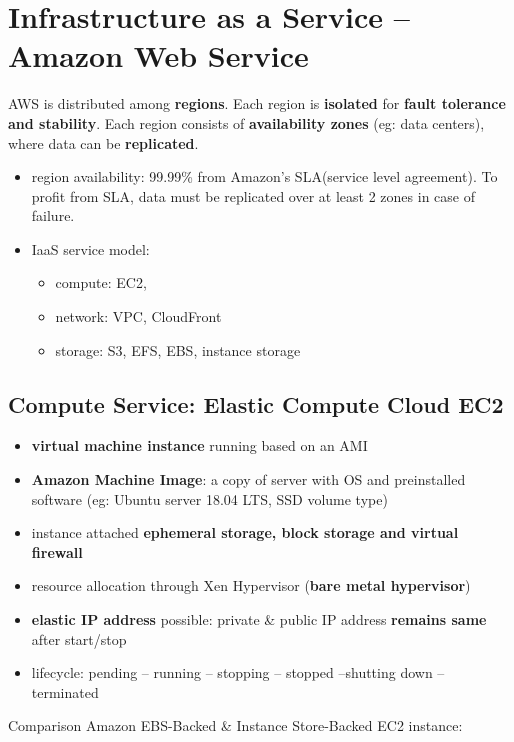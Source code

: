 \section{Infrastructure as a Service -- Amazon Web Service}

AWS is distributed among \textbf{regions}. Each region is \textbf{isolated} for \textbf{fault tolerance and stability}. Each region consists of \textbf{availability zones} (eg: data centers), where data can be \textbf{replicated}. 

\begin{itemize}
	\item region availability: 99.99\% from Amazon's SLA(service level agreement). To profit from SLA, data must be replicated over at least 2 zones in case of failure.
	\item IaaS service model:
	\begin{itemize}
		\item compute: EC2,
		\item network: VPC, CloudFront
		\item storage: S3, EFS, EBS, instance storage
	\end{itemize}
\end{itemize}

\subsection{Compute Service: Elastic Compute Cloud EC2}
\begin{itemize}
	\item \textbf{virtual machine instance} running based on an AMI
	\item \textbf{Amazon Machine Image}: a copy of server with OS and preinstalled software (eg: Ubuntu server 18.04 LTS, SSD volume type)
	\item instance attached \textbf{ephemeral storage, block storage and virtual firewall}
	\item resource allocation through Xen Hypervisor (\textbf{bare metal hypervisor}) 
	\item \textbf{elastic IP address} possible: private \& public IP address \textbf{remains same} after start/stop 
	\item lifecycle: pending -- running -- stopping -- stopped --shutting down -- terminated
\end{itemize}

Comparison Amazon EBS-Backed \& Instance Store-Backed EC2 instance:

